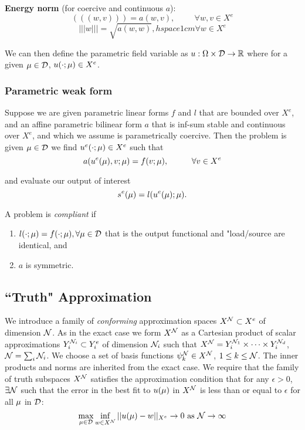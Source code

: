 \textbf{Energy norm} (for coercive and continuous $a$): 
\begin{equation}
(((w,v))) = a(w,v), \hspace{1cm} \forall w,v \in X^e
\end{equation}
\begin{equation}
|||w||| = \sqrt{a(w,w)}, hspace{1cm} \forall w \in X^e
\end{equation}

We can then define the parametric field variable as $u:\Omega \times \mathcal{D} \rightarrow \mathbb{R}$ where for a given ${\mathbf{\mu}} \in \mathcal{D}$, $u(\cdot; {\mathbf{\mu}})\in X^e$.

\subsubsection{Parametric weak form}
Suppose we are given parametric linear forms $f$ and $l$ that are bounded over $X^e$, and an affine parametric bilinear form $a$ that is inf-sum stable and continuous over $X^e$, and which we assume is parametrically coercive. Then the problem is given ${\mathbf{\mu}} \in \mathcal{D}$ we find $u^e(\cdot; {\mathbf{\mu}}) \in X^e$ such that 
\begin{equation}
a(u^e({\mathbf{\mu}}), v; {\mathbf{\mu}}) = f(v; {\mathbf{\mu}}), \hspace{1cm} \forall v \in X^e
\end{equation}

and evaluate our output of interest 
\begin{equation}
s^e({\mathbf{\mu}})=l(u^e({\mathbf{\mu}}); {\mathbf{\mu}}).
\end{equation}

A problem is \textit{compliant} if 
\begin{enumerate}
\item $l(\cdot;{\mathbf{\mu}}) = f(\cdot;{\mathbf{\mu}}), \forall {\mathbf{\mu}} \in \mathcal{D}$ that is the output functional and "load/source are identical, and
\item $a$ is symmetric.
\end{enumerate}

\subsection{``Truth" Approximation}
We introduce a family of \textit{conforming} approximation spaces $X^{\mathcal{N}} \subset X^e$ of dimension $\mathcal{N}$. As in the exact case we form $X^{\mathcal{N}}$ as a Cartesian product of scalar approximations $Y^{\mathcal{N}_i}_i \subset Y^e_i$ of dimension $\mathcal{N}_i$ such that $X^{\mathcal{N}}=Y^{\mathcal{N}_1}_i\times\cdots\times Y^{\mathcal{N}_d}_i$, $\mathcal{N} = \sum_i \mathcal{N}_i$. We choose a set of basis functions $\psi^{\mathcal{N}}_k \in X^{\mathcal{N}}$, $1\leq k \leq \mathcal{N}$. The inner products and norms are inherited from the exact case. We require that the family of truth  subspaces $X^{\mathcal{N}}$ satisfies the approximation condition that for any $\epsilon > 0$, $\exists \mathcal{N}$ such that the error in the best fit to $u({\mathbf{\mu}})$ in $X^{\mathcal{N}}$ is less than or equal to $\epsilon$ for all ${\mathbf{\mu}}$ in $\mathcal{D}$:
\begin{equation}\label{eq:ApprCond}
\max_{{\mathbf{\mu}} \in \mathcal{D}} \inf_{w \in X^{\mathcal{N}}} || u({\mathbf{\mu}})-w ||_{X^e}\rightarrow 0 \mbox{ as } \mathcal{N} \rightarrow \infty 
\end{equation}

